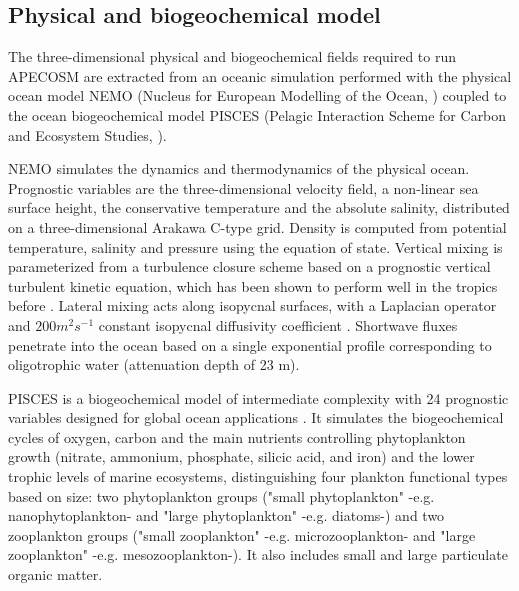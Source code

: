 
\subsection{Physical and biogeochemical model}
\label{sec:nemo}

The three-dimensional physical and biogeochemical fields required to run APECOSM are extracted from an oceanic simulation performed with the physical ocean model NEMO (Nucleus for European Modelling of the Ocean, \citealp{madecNEMOOceanEngine2019}) coupled to the ocean biogeochemical model PISCES (Pelagic Interaction Scheme for Carbon and Ecosystem Studies, \citealp{aumontPISCESv2OceanBiogeochemical2015}). 

NEMO simulates the dynamics and thermodynamics of the physical ocean. Prognostic variables are
the three-dimensional velocity field, a non-linear sea surface height, the
conservative temperature and the absolute salinity, distributed on a three-dimensional Arakawa C-type grid. Density is computed from potential temperature, salinity and pressure using the \cite{iocInternationalThermodynamicEquation2010} equation of state. Vertical mixing is parameterized from a turbulence closure scheme based on a prognostic vertical turbulent kinetic equation, which has been shown to perform well in the tropics before \citep{blankeVariabilityTropicalAtlantic1993}. Lateral mixing acts along isopycnal surfaces, with a Laplacian operator and $200 m^2 s^{-1}$ constant isopycnal diffusivity coefficient \citep{lengaigneImpactIsopycnalMixing2003}. Shortwave fluxes penetrate into the ocean based on a single exponential profile \citep{paulsonIrradianceMeasurementsUpper1977} corresponding to oligotrophic water (attenuation depth of 23 m). 

PISCES is a biogeochemical model of intermediate complexity with 24 prognostic variables designed for global ocean applications \citep{aumontPISCESv2OceanBiogeochemical2015}. It simulates the biogeochemical cycles of oxygen, carbon and the main nutrients controlling phytoplankton growth (nitrate, ammonium, phosphate, silicic acid, and iron) and the lower trophic levels of marine ecosystems, distinguishing four plankton functional types based on size: two phytoplankton groups ("small phytoplankton" -e.g. nanophytoplankton- and "large phytoplankton" -e.g. diatoms-) and two zooplankton groups ("small zooplankton" -e.g. microzooplankton- and "large zooplankton" -e.g. mesozooplankton-). It also includes small and large particulate organic matter.

